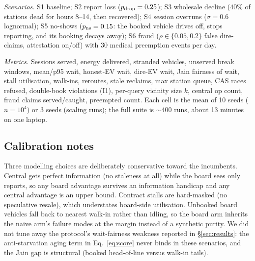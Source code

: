 \documentclass[twoside,twocolumn,usenatbib]{mnras}
\begin{document}
\emph{Scenarios.}  S1 baseline; S2 report loss ($p_{\rm drop}=0.25$);
S3 wholesale decline ($40\%$ of stations dead for hours 8--14, then
recovered); S4 session overruns ($\sigma=0.6$ lognormal); S5 no-shows
($p_{\rm ns}=0.15$: the booked vehicle drives off, stops reporting,
and its booking decays away); S6 fraud ($\rho\in\{0.05,0.2\}$ false
dire-claims, attestation on/off) with $30$ medical preemption events
per day.

\emph{Metrics.}  Sessions served, energy delivered, stranded vehicles,
unserved break windows, mean/p95 wait, honest-EV wait, dire-EV wait,
Jain fairness of wait, stall utilisation, walk-ins, reroutes, stale
reclaims, max station queue, CAS races refused, double-book
violations (I1), per-query vicinity size $k$, central op count,
fraud claims served/caught, preempted count.  Each cell is the mean
of 10 seeds ($n=10^4$) or 3 seeds (scaling runs); the full suite is
$\sim$400 runs, about 13 minutes on one laptop.

\subsection{Calibration notes}

Three modelling choices are deliberately conservative toward the
incumbents.  Central gets perfect information (no staleness at all)
while the board sees only reports, so any board advantage survives
an information handicap and any central advantage is
an upper bound.  Contract stalls are hard-masked (no speculative
resale), which understates board-side utilisation.  Unbooked board
vehicles fall back to nearest walk-in rather than idling, so the
board arm inherits the naive arm's failure modes at the margin
instead of a synthetic purity.  We did not tune away the protocol's
wait-fairness weakness reported in \S\ref{sec:results}: the
anti-starvation aging term in Eq.~\ref{eq:score} never binds in these
scenarios, and the Jain gap is structural (booked head-of-line versus
walk-in tails).
\end{document}
